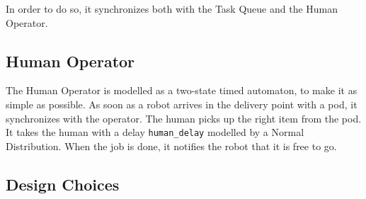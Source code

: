 In order to do so, it synchronizes both with the Task Queue and the Human Operator. 

\subsection{Human Operator}	
The Human Operator is modelled as a two-state timed automaton, to make it as simple as possible. As soon as a robot arrives in the delivery point with a pod, it synchronizes with the operator. The human picks up the right item from the pod. It takes the human with a delay \texttt{human\_delay} modelled by a Normal Distribution. When the job is done, it notifies the robot that it is free to go. 

\subsection{Design Choices}
